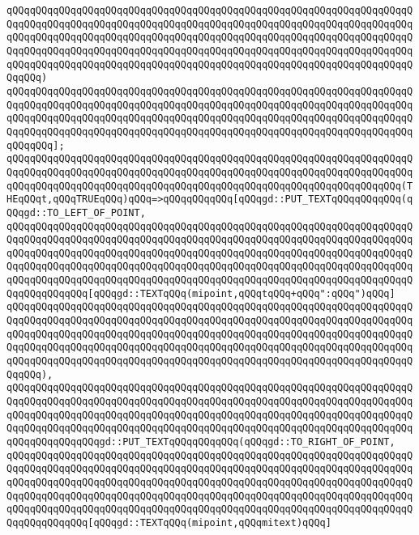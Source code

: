 \verb|qQQqqQQqqQQqqQQqqQQqqQQqqQQqqQQqqQQqqQQqqQQqqQQqqQQqqQQqqQQqqQQqqQQqqQQqqQQqqQQqqQQqqQQqqQQqqQQqqQQqqQQqqQQqqQQqqQQqqQQqqQQqqQQqqQQqqQQqqQQqqQQqqQQqqQQqqQQqqQQqqQQqqQQqqQQqqQQqqQQqqQQqqQQqqQQqqQQqqQQqqQQqqQQqqQQqqQQqqQQqqQQqqQQqqQQqqQQqqQQqqQQqqQQqqQQqqQQqqQQqqQQqqQQqqQQqqQQqqQQqqQQqqQQqqQQqqQQqqQQqqQQqqQQqqQQqqQQqqQQqqQQqqQQqqQQqqQQqqQQqqQQqqQQqqQQqqQQq)|\newline
\verb|qQQqqQQqqQQqqQQqqQQqqQQqqQQqqQQqqQQqqQQqqQQqqQQqqQQqqQQqqQQqqQQqqQQqqQQqqQQqqQQqqQQqqQQqqQQqqQQqqQQqqQQqqQQqqQQqqQQqqQQqqQQqqQQqqQQqqQQqqQQqqQQqqQQqqQQqqQQqqQQqqQQqqQQqqQQqqQQqqQQqqQQqqQQqqQQqqQQqqQQqqQQqqQQqqQQqqQQqqQQqqQQqqQQqqQQqqQQqqQQqqQQqqQQqqQQqqQQqqQQqqQQqqQQqqQQqqQQqqQQqqQQqqQQq];|\newline
\verb|qQQqqQQqqQQqqQQqqQQqqQQqqQQqqQQqqQQqqQQqqQQqqQQqqQQqqQQqqQQqqQQqqQQqqQQqqQQqqQQqqQQqqQQqqQQqqQQqqQQqqQQqqQQqqQQqqQQqqQQqqQQqqQQqqQQqqQQqqQQqqQQqqQQqqQQqqQQqqQQqqQQqqQQqqQQqqQQqqQQqqQQqqQQqqQQqqQQqqQQqqQQqqQQq(THEqQQqt,qQQqTRUEqQQq)qQQq=>qQQqqQQqqQQq[qQQqgd::PUT_TEXTqQQqqQQqqQQq(qQQqgd::TO_LEFT_OF_POINT,|\newline
\verb|qQQqqQQqqQQqqQQqqQQqqQQqqQQqqQQqqQQqqQQqqQQqqQQqqQQqqQQqqQQqqQQqqQQqqQQqqQQqqQQqqQQqqQQqqQQqqQQqqQQqqQQqqQQqqQQqqQQqqQQqqQQqqQQqqQQqqQQqqQQqqQQqqQQqqQQqqQQqqQQqqQQqqQQqqQQqqQQqqQQqqQQqqQQqqQQqqQQqqQQqqQQqqQQqqQQqqQQqqQQqqQQqqQQqqQQqqQQqqQQqqQQqqQQqqQQqqQQqqQQqqQQqqQQqqQQqqQQqqQQqqQQqqQQqqQQqqQQqqQQqqQQqqQQqqQQqqQQqqQQqqQQqqQQqqQQqqQQqqQQqqQQqqQQqqQQqqQQqqQQqqQQq[qQQqgd::TEXTqQQq(mipoint,qQQqtqQQq+qQQq":qQQq")qQQq]|\newline
\verb|qQQqqQQqqQQqqQQqqQQqqQQqqQQqqQQqqQQqqQQqqQQqqQQqqQQqqQQqqQQqqQQqqQQqqQQqqQQqqQQqqQQqqQQqqQQqqQQqqQQqqQQqqQQqqQQqqQQqqQQqqQQqqQQqqQQqqQQqqQQqqQQqqQQqqQQqqQQqqQQqqQQqqQQqqQQqqQQqqQQqqQQqqQQqqQQqqQQqqQQqqQQqqQQqqQQqqQQqqQQqqQQqqQQqqQQqqQQqqQQqqQQqqQQqqQQqqQQqqQQqqQQqqQQqqQQqqQQqqQQqqQQqqQQqqQQqqQQqqQQqqQQqqQQqqQQqqQQqqQQqqQQqqQQqqQQqqQQqqQQqqQQqqQQqqQQqqQQq),|\newline
\verb|qQQqqQQqqQQqqQQqqQQqqQQqqQQqqQQqqQQqqQQqqQQqqQQqqQQqqQQqqQQqqQQqqQQqqQQqqQQqqQQqqQQqqQQqqQQqqQQqqQQqqQQqqQQqqQQqqQQqqQQqqQQqqQQqqQQqqQQqqQQqqQQqqQQqqQQqqQQqqQQqqQQqqQQqqQQqqQQqqQQqqQQqqQQqqQQqqQQqqQQqqQQqqQQqqQQqqQQqqQQqqQQqqQQqqQQqqQQqqQQqqQQqqQQqqQQqqQQqqQQqqQQqqQQqqQQqqQQqqQQqqQQqqQQqqQQqqQQqgd::PUT_TEXTqQQqqQQqqQQq(qQQqgd::TO_RIGHT_OF_POINT,|\newline
\verb|qQQqqQQqqQQqqQQqqQQqqQQqqQQqqQQqqQQqqQQqqQQqqQQqqQQqqQQqqQQqqQQqqQQqqQQqqQQqqQQqqQQqqQQqqQQqqQQqqQQqqQQqqQQqqQQqqQQqqQQqqQQqqQQqqQQqqQQqqQQqqQQqqQQqqQQqqQQqqQQqqQQqqQQqqQQqqQQqqQQqqQQqqQQqqQQqqQQqqQQqqQQqqQQqqQQqqQQqqQQqqQQqqQQqqQQqqQQqqQQqqQQqqQQqqQQqqQQqqQQqqQQqqQQqqQQqqQQqqQQqqQQqqQQqqQQqqQQqqQQqqQQqqQQqqQQqqQQqqQQqqQQqqQQqqQQqqQQqqQQqqQQqqQQqqQQqqQQqqQQqqQQq[qQQqgd::TEXTqQQq(mipoint,qQQqmitext)qQQq]|\newline
